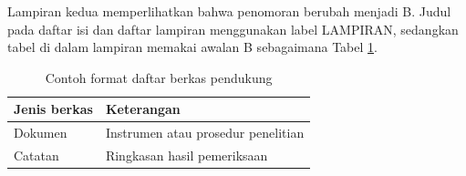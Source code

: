 Lampiran kedua memperlihatkan bahwa penomoran berubah menjadi B. Judul pada daftar isi dan daftar lampiran menggunakan label LAMPIRAN, sedangkan tabel di dalam lampiran memakai awalan B sebagaimana Tabel \ref{tab:lampiran-b}.
\begin{table}[htbp]
\centering
\caption{Contoh format daftar berkas pendukung}
\label{tab:lampiran-b}
\begin{tabular}{ll}
\toprule
Jenis berkas & Keterangan \\
\midrule
Dokumen & Instrumen atau prosedur penelitian \\
Catatan & Ringkasan hasil pemeriksaan \\
\bottomrule
\end{tabular}
\end{table}
